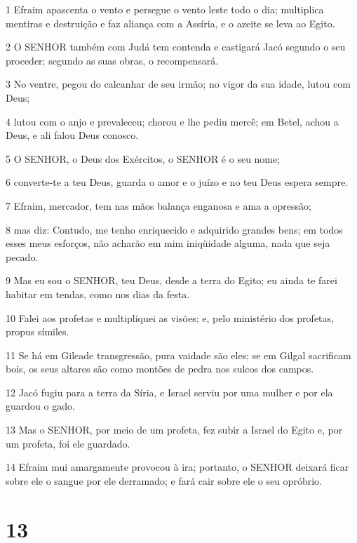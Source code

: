 \par 1 Efraim apascenta o vento e persegue o vento leste todo o dia; multiplica mentiras e destruição e faz aliança com a Assíria, e o azeite se leva ao Egito.
\par 2 O SENHOR também com Judá tem contenda e castigará Jacó segundo o seu proceder; segundo as suas obras, o recompensará.
\par 3 No ventre, pegou do calcanhar de seu irmão; no vigor da sua idade, lutou com Deus;
\par 4 lutou com o anjo e prevaleceu; chorou e lhe pediu mercê; em Betel, achou a Deus, e ali falou Deus conosco.
\par 5 O SENHOR, o Deus dos Exércitos, o SENHOR é o seu nome;
\par 6 converte-te a teu Deus, guarda o amor e o juízo e no teu Deus espera sempre.
\par 7 Efraim, mercador, tem nas mãos balança enganosa e ama a opressão;
\par 8 mas diz: Contudo, me tenho enriquecido e adquirido grandes bens; em todos esses meus esforços, não acharão em mim iniqüidade alguma, nada que seja pecado.
\par 9 Mas eu sou o SENHOR, teu Deus, desde a terra do Egito; eu ainda te farei habitar em tendas, como nos dias da festa.
\par 10 Falei aos profetas e multipliquei as visões; e, pelo ministério dos profetas, propus símiles.
\par 11 Se há em Gileade transgressão, pura vaidade são eles; se em Gilgal sacrificam bois, os seus altares são como montões de pedra nos sulcos dos campos.
\par 12 Jacó fugiu para a terra da Síria, e Israel serviu por uma mulher e por ela guardou o gado.
\par 13 Mas o SENHOR, por meio de um profeta, fez subir a Israel do Egito e, por um profeta, foi ele guardado.
\par 14 Efraim mui amargamente provocou à ira; portanto, o SENHOR deixará ficar sobre ele o sangue por ele derramado; e fará cair sobre ele o seu opróbrio.

\chapter{13}

